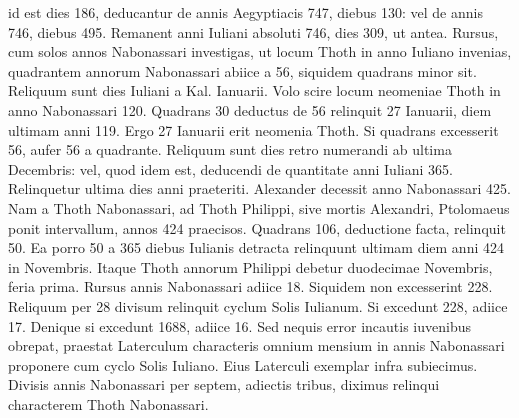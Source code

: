 id est dies 186, deducantur de annis Aegyptiacis 747, diebus 130:
vel de annis 746, diebus 495.
Remanent anni Iuliani absoluti 746,
dies 309, ut antea.
Rursus, cum solos annos Nabonassari investigas,
ut locum Thoth in anno Iuliano invenias, quadrantem annorum
Nabonassari abiice a 56, siquidem quadrans minor sit.
Reliquum
sunt dies Iuliani a Kal. Ianuarii.
Volo scire locum neomeniae Thoth
in anno Nabonassari 120.
Quadrans 30 deductus de 56 relinquit
27 Ianuarii, diem ultimam anni 119.
Ergo 27 Ianuarii erit neomenia
Thoth.
Si quadrans excesserit 56, aufer 56 a quadrante.
Reliquum
sunt dies retro numerandi ab ultima Decembris: vel, quod
idem est, deducendi de quantitate anni Iuliani 365.
Relinquetur ultima
dies anni praeteriti.
Alexander decessit anno Nabonassari 425.
Nam a Thoth Nabonassari, ad Thoth Philippi, sive mortis Alexandri,
Ptolomaeus ponit intervallum, annos 424 praecisos.
Quadrans
106, deductione facta, relinquit 50.
Ea porro 50 a 365
diebus Iulianis detracta relinquunt ultimam diem anni 424
in  Novembris.
Itaque Thoth annorum Philippi debetur
duodecimae Novembris, feria prima.
Rursus annis Nabonassari
adiice 18.
Siquidem non excesserint 228.
Reliquum per 28
divisum relinquit cyclum Solis Iulianum.
Si excedunt 228, adiice
17.
Denique si excedunt 1688, adiice 16.
Sed nequis error
incautis iuvenibus obrepat, praestat Laterculum characteris omnium
mensium in annis Nabonassari proponere cum cyclo Solis
Iuliano.
%
Eius Laterculi exemplar infra subiecimus.
Divisis annis
Nabonassari per septem, adiectis tribus, diximus relinqui characterem
Thoth Nabonassari.






























